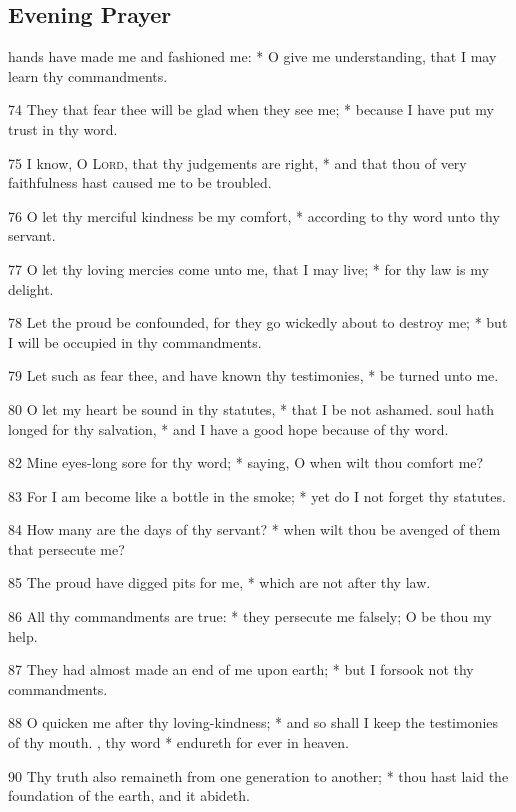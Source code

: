 \subsection{Evening Prayer}
 hands have made me and fashioned me: * O give me understanding, that I may learn thy commandments.\par
74 They that fear thee will be glad when they see me; * because I have put my trust in thy word.\par
75 I know, O {\textsc{Lord}}, that thy judgements are right, * and that thou of very faithfulness hast caused me to be troubled.\par
76 O let thy merciful kindness be my comfort, * according to thy word unto thy servant.\par
77 O let thy loving mercies come unto me, that I may live; * for thy law is my delight.\par
78 Let the proud be confounded, for they go wickedly about to destroy me; * but I will be occupied in thy commandments.\par
79 Let such as fear thee, and have known thy testimonies, * be turned unto me.\par
80 O let my heart be sound in thy statutes, * that I be not ashamed.
 soul hath longed for thy salvation, * and I have a good hope because of thy word.\par
82 Mine eyes-long sore for thy word; * saying, O when wilt thou comfort me?\par
83 For I am become like a bottle in the smoke; * yet do I not forget thy statutes.\par
84 How many are the days of thy servant? * when wilt thou be avenged of them that persecute me?\par
85 The proud have digged pits for me, * which are not after thy law.\par
86 All thy commandments are true: * they persecute me falsely; O be thou my help.\par
87 They had almost made an end of me upon earth; * but I forsook not thy commandments.\par
88 O quicken me after thy loving-kindness; * and so shall I keep the testimonies of thy mouth.
, thy word * endureth for ever in heaven.\par
90 Thy truth also remaineth from one generation to another; * thou hast laid the foundation of the earth, and it abideth.\par
